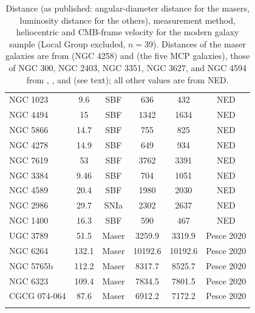 \documentclass[11pt]{article}
\begin{document}
{\begin{longtable}{lccccc}
NGC 1023 & 9.6 & SBF & 636 & 432 & NED \\
NGC 4494 & 15 & SBF & 1342 & 1634 & NED \\
NGC 5866 & 14.7 & SBF & 755 & 825 & NED \\
NGC 4278 & 14.9 & SBF & 649 & 934 & NED \\
NGC 7619 & 53 & SBF & 3762 & 3391 & NED \\
NGC 3384 & 9.46 & SBF & 704 & 1051 & NED \\
NGC 4589 & 20.4 & SBF & 1980 & 2030 & NED \\
NGC 2986 & 29.7 & SNIa & 2302 & 2637 & NED \\
NGC 1400 & 16.3 & SBF & 590 & 467 & NED \\
UGC 3789 & 51.5 & Maser & 3259.9 & 3319.9 & Pesce 2020 \\
NGC 6264 & 132.1 & Maser & 10192.6 & 10192.6 & Pesce 2020 \\
NGC 5765b & 112.2 & Maser & 8317.7 & 8525.7 & Pesce 2020 \\
NGC 6323 & 109.4 & Maser & 7834.5 & 7801.5 & Pesce 2020 \\
CGCG 074-064 & 87.6 & Maser & 6912.2 & 7172.2 & Pesce 2020 \\
\caption{Distance (as published: angular-diameter distance for the masers, luminosity distance for the others), measurement method, heliocentric and CMB-frame velocity for the modern galaxy sample (Local Group excluded, $n = 39$). Distances of the maser galaxies are from \citet{reid2019} (NGC 4258) and \citet{pesce2020} (the five MCP galaxies), those of NGC 300, NGC 2403, NGC 3351, NGC 3627, and NGC 4594 from \citet{gieren2005}, \citet{freedman2001}, and \citet{mcquinn2016} (see text); all other values are from NED.}
\label{tab:modern_data} \\
\end{longtable}
}
\end{document}
